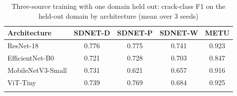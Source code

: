 \begin{table}[t]
\caption{Three-source training with one domain held out: crack-class F1 on the held-out domain by architecture (mean over 3 seeds)}\label{tab:A-multi}
\begin{tabular*}{\textwidth}{@{\extracolsep\fill}lcccc@{}}
\toprule
Architecture & SDNET-D & SDNET-P & SDNET-W & METU \\
\midrule
ResNet-18 & 0.776 & 0.775 & 0.741 & 0.923 \\
EfficientNet-B0 & 0.721 & 0.728 & 0.703 & 0.847 \\
MobileNetV3-Small & 0.731 & 0.621 & 0.657 & 0.916 \\
ViT-Tiny & 0.739 & 0.769 & 0.684 & 0.925 \\
\botrule
\end{tabular*}
\end{table}
